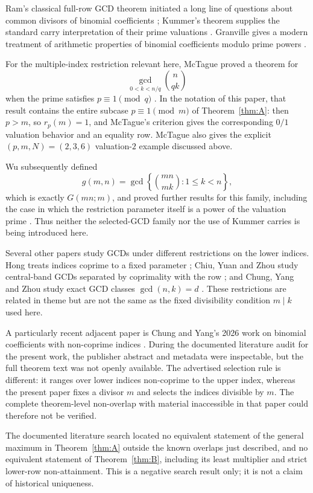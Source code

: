 \documentclass[11pt]{article}
\theoremstyle{definition}
\theoremstyle{remark}
\begin{document}
Ram's classical full-row GCD theorem initiated a long line of questions about common divisors of binomial coefficients \cite{Ram1909}; Kummer's theorem supplies the standard carry interpretation of their prime valuations \cite{Kummer1852}. Granville gives a modern treatment of arithmetic properties of binomial coefficients modulo prime powers \cite{Granville1997}.

For the multiple-index restriction relevant here, McTague proved a theorem for
\[
  \gcd_{0<k<n/q}\binom n{qk}
\]
when the prime satisfies $p\equiv1\pmod q$ \cite{McTague2017}. In the notation of this paper, that result contains the entire subcase $p\equiv1\pmod m$ of Theorem~\ref{thm:A}: then $p>m$, so $r_p(m)=1$, and McTague's criterion gives the corresponding $0/1$ valuation behavior and an equality row. McTague also gives the explicit $(p,m,N)=(2,3,6)$ valuation-$2$ example discussed above.

Wu subsequently defined
\[
  g(m,n)=\gcd\left\{\binom{mn}{mk}:1\le k<n\right\},
\]
which is exactly $G(mn;m)$, and proved further results for this family, including the case in which the restriction parameter itself is a power of the valuation prime \cite{Wu2026}. Thus neither the selected-GCD family nor the use of Kummer carries is being introduced here.

Several other papers study GCDs under different restrictions on the lower indices. Hong treats indices coprime to a fixed parameter \cite{Hong2016}; Chiu, Yuan and Zhou study central-band GCDs separated by coprimality with the row \cite{ChiuYuanZhou2023}; and Chung, Yang and Zhou study exact GCD classes $\gcd(n,k)=d$ \cite{ChungYangZhou2025}. These restrictions are related in theme but are not the same as the fixed divisibility condition $m\mid k$ used here.

A particularly recent adjacent paper is Chung and Yang's 2026 work on binomial coefficients with non-coprime indices \cite{ChungYang2026}. During the documented literature audit for the present work, the publisher abstract and metadata were inspectable, but the full theorem text was not openly available. The advertised selection rule is different: it ranges over lower indices non-coprime to the upper index, whereas the present paper fixes a divisor $m$ and selects the indices divisible by $m$. The complete theorem-level non-overlap with material inaccessible in that paper could therefore not be verified.

The documented literature search located no equivalent statement of the general maximum in Theorem~\ref{thm:A} outside the known overlaps just described, and no equivalent statement of Theorem~\ref{thm:B}, including its least multiplier and strict lower-row non-attainment. This is a negative search result only; it is not a claim of historical uniqueness.
\end{document}
